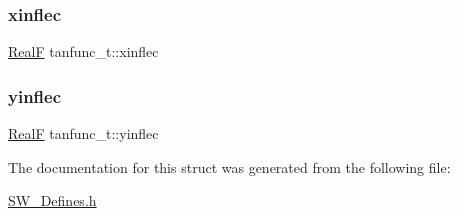 \mbox{\label{structtanfunc__t_af302497555fcc6e85d0e5f5aff7a0751}} 
\subsubsection{\texorpdfstring{xinflec}{xinflec}}
{\footnotesize\ttfamily \hyperlink{generic_8h_a94d667c93da0511f21142d988f67674f}{RealF} tanfunc\+\_\+t\+::xinflec}

\mbox{\label{structtanfunc__t_a7b917642c1d68005c5fc6f055ef7024d}} 
\subsubsection{\texorpdfstring{yinflec}{yinflec}}
{\footnotesize\ttfamily \hyperlink{generic_8h_a94d667c93da0511f21142d988f67674f}{RealF} tanfunc\+\_\+t\+::yinflec}



The documentation for this struct was generated from the following file\+:\begin{DoxyCompactItemize}
\item 
\hyperlink{_s_w___defines_8h}{S\+W\+\_\+\+Defines.\+h}\end{DoxyCompactItemize}
